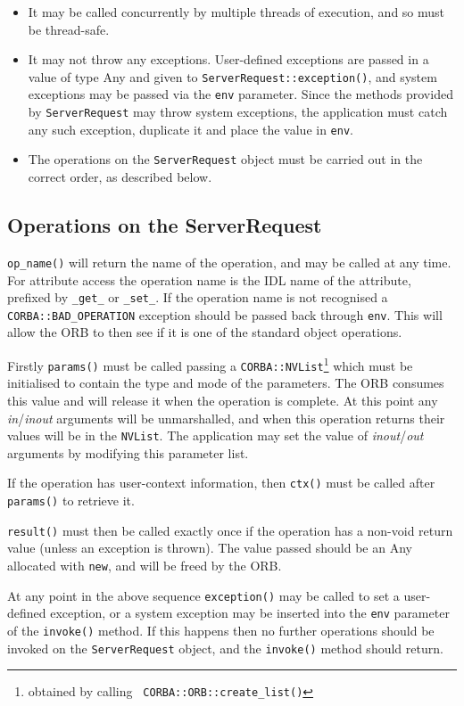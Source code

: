 \documentclass[11pt,twoside,onecolumn]{book}
\begin{document}
\begin{itemize}
\item It may be called concurrently by multiple threads of execution, and
so must be thread-safe.
\item It may not throw any exceptions. User-defined exceptions are passed
in a value of type Any and given to
{\tt ServerRequest::exception()}, and system exceptions may be
passed via the {\tt env} parameter. Since the methods provided by
{\tt ServerRequest} may throw system exceptions, the application must catch
any such exception, duplicate it and place the value in {\tt env}.
\item The operations on the {\tt ServerRequest} object must be carried out
in the correct order, as described below.
\end{itemize}


\subsection{Operations on the ServerRequest}

{\tt op\_name()} will return the name of the operation, and may be called at
any time. For attribute access the operation name is the IDL name of the
attribute, prefixed by {\tt \_get\_} or {\tt \_set\_}. If the operation name
is not recognised a {\tt CORBA::BAD\_OPERATION} exception should be passed
back through {\tt env}. This will allow the ORB to then see if it is one of
the standard object operations.

Firstly {\tt params()} must be called passing a
{\tt CORBA::NVList}\footnote{obtained by calling {\tt
CORBA::ORB::create\_list()}}
which must be initialised to contain the type and mode of the parameters.
The ORB consumes this
value and will release it when the operation is complete. At this point any
\emph{in}/\emph{inout} arguments will be unmarshalled, and when this operation
returns their values will be in the {\tt NVList}. The application may set
the value of \emph{inout}/\emph{out} arguments by modifying this
parameter list.

If the operation has user-context information, then {\tt ctx()} must be
called after {\tt params()} to retrieve it.

{\tt result()} must then be called exactly once if the operation has a non-void
return value (unless an exception is thrown). The value passed should be
an Any allocated with {\tt new}, and will be freed by the ORB.

At any point in the above sequence {\tt exception()} may be called to set
a user-defined exception, or a system exception may be inserted into
the {\tt env} parameter of the {\tt invoke()} method. If this happens then no
further operations should be invoked on the {\tt ServerRequest} object, and
the {\tt invoke()} method should return.
\end{document}
